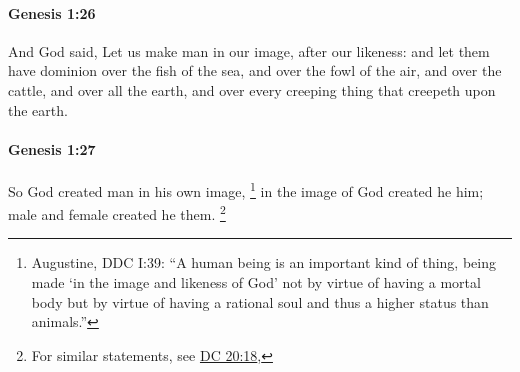 		\paragraph{Genesis 1:26} %
			\label{GENESIS-1-26}

			And God said, Let us make man in our image, after our likeness: and let them have dominion over the fish of the sea, and over the fowl of the air, and over the cattle, and over all the earth, and over every creeping thing that creepeth upon the earth.

			\begin{framed}
			\scriptsize
				\begin{compactdesc}
					\item[LXX] 
				\end{compactdesc}
			\end{framed}

		\paragraph{Genesis 1:27} %
			\label{GENESIS-1-27}

			So God created man in his own image,%
				\footnote{%
					Augustine, DDC I:39: ``A human being is an important kind of thing, being made `in the image and likeness of God' not by virtue of having a mortal body but by virtue of having a rational soul and thus a higher status than animals.''
					}
			in the image of God created he him; male and female created he them.%
				\footnote{%
					For similar statements, see \hyperref[DC20-18]{DC 20:18}, 
					}

